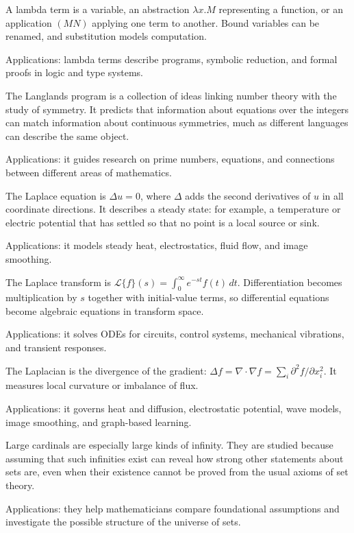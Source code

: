 A lambda term is a variable, an abstraction $\lambda x.M$ representing a function, or an application $(MN)$ applying one term to another. Bound variables can be renamed, and substitution models computation. \par\noindent Applications: lambda terms describe programs, symbolic reduction, and formal proofs in logic and type systems.

The Langlands program is a collection of ideas linking number theory with the study of symmetry. It predicts that information about equations over the integers can match information about continuous symmetries, much as different languages can describe the same object. \par\noindent Applications: it guides research on prime numbers, equations, and connections between different areas of mathematics.

The Laplace equation is $\Delta u=0$, where $\Delta$ adds the second derivatives of $u$ in all coordinate directions. It describes a steady state: for example, a temperature or electric potential that has settled so that no point is a local source or sink. \par\noindent Applications: it models steady heat, electrostatics, fluid flow, and image smoothing.

The Laplace transform is $\mathcal L\{f\}(s)=\int_0^\infty e^{-st}f(t)\,dt$. Differentiation becomes multiplication by $s$ together with initial-value terms, so differential equations become algebraic equations in transform space. \par\noindent Applications: it solves ODEs for circuits, control systems, mechanical vibrations, and transient responses.

The Laplacian is the divergence of the gradient: $\Delta f=\nabla\cdot\nabla f=\sum_i\partial^2f/\partial x_i^2$. It measures local curvature or imbalance of flux. \par\noindent Applications: it governs heat and diffusion, electrostatic potential, wave models, image smoothing, and graph-based learning.

Large cardinals are especially large kinds of infinity. They are studied because assuming that such infinities exist can reveal how strong other statements about sets are, even when their existence cannot be proved from the usual axioms of set theory. \par\noindent Applications: they help mathematicians compare foundational assumptions and investigate the possible structure of the universe of sets.

